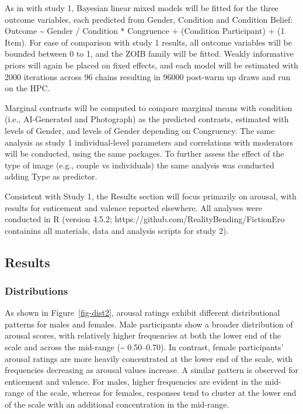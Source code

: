 \documentclass[
  jou,
  floatsintext,
  longtable,
  nolmodern,
  notxfonts,
  notimes,
  colorlinks=true,linkcolor=blue,citecolor=blue,urlcolor=blue]{apa7}
\begin{document}
As in with study 1, Bayesian linear mixed models will be fitted for the
three outcome variables, each predicted from Gender, Condition and
Condition Belief: Outcome \textasciitilde{} Gender / Condition *
Congruence + (Condition \textbar{} Participant) + (1 \textbar{} Item).
For ease of comparison with study 1 results, all outcome variables will
be bounded between 0 to 1, and the ZOIB family will be fitted. Weakly
informative priors will again be placed on fixed effects, and each model
will be estimated with 2000 iterations across 96 chains resulting in
96000 post-warm up draws and run on the HPC.

Marginal contrasts will be computed to compare marginal means with
condition (i.e., AI-Generated and Photograph) as the predicted
contrasts, estimated with levels of Gender, and levels of Gender
depending on Congruency. The same analysis as study 1 individual-level
parameters and correlations with moderators will be conducted, using the
same packages. To further assess the effect of the type of image (e.g.,
couple vs individuals) the same analysis was conducted adding Type as
predictor.

Consistent with Study 1, the Results section will focus primarily on
arousal, with results for enticement and valence reported elsewhere. All
analyses were conducted in R (version 4.5.2;
https://github.com/RealityBending/FictionEro containins all materials,
data and analysis scripts for study 2).

\subsection{Results}\label{results-1}

\subsubsection{Distributions}\label{distributions-1}

As shown in Figure~\ref{fig-dist2}, arousal ratings exhibit different
distributional patterns for males and females. Male participants show a
broader distribution of arousal scores, with relatively higher
frequencies at both the lower end of the scale and across the mid-range
(\textasciitilde{} 0.50--0.70). In contrast, female participants'
arousal ratings are more heavily concentrated at the lower end of the
scale, with frequencies decreasing as arousal values increase. A similar
pattern is observed for enticement and valence. For males, higher
frequencies are evident in the mid-range of the scale, whereas for
females, responses tend to cluster at the lower end of the scale with an
additional concentration in the mid-range.
\end{document}
